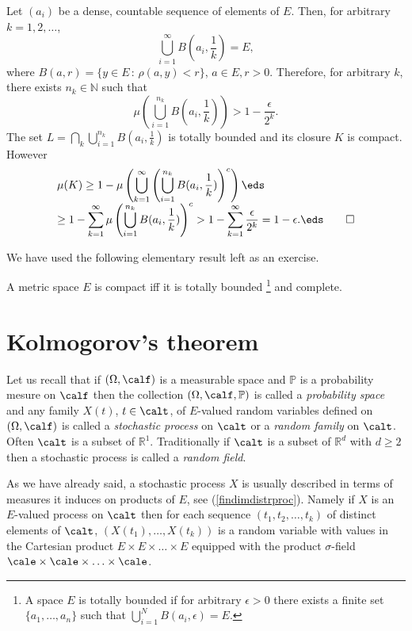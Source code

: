 \documentclass[preprint]{imsart}
\def\P{\mathbb P}
\def\N{\mathbb N}
\def\R{\mathbb R}
\def\ds{\displaystyle}
\begin{document}
{
Let $(a_i)$ be a dense, countable sequence of elements
of $E$. Then, for arbitrary $k=1,2,\ldots$,
$$
\bigcup_{i=1}^\infty B(a_i,\frac{1}{k}) =E,
$$
where $B(a,r)=\{ y\in E\, :\, \rho (a,y)<r\}$, $a\in
E,r>0$. Therefore, for arbitrary $k$, there exists
$n_k\in\N$ such that
$$
\mu\left(\bigcup_{i=1}^{n_k}B(a_i,\frac{1}{k})\right) >
1-\frac{\epsilon}{2^k}.
$$
The set $L= \bigcap_k\bigcup_{i=1}^{n_k}
B(a_i,\frac{1}{k})$ is totally bounded and its closure
$K$ is compact. However
$$
  \begin{array}{l}
    \ds \mu (K)\geq 1-\mu \left(\bigcup_{k=1}^\infty
    \left(\bigcup_{i=1}^{n_k} B(a_i,\frac{1}{k})\right)^c
    \right)\eds \\\ds
    \geq 1-\sum_{k=1}^\infty \mu
     \left(\bigcup_{i=1}^{n_k} B(a_i,\frac{1}{k})\right)^c
     > 1-\sum_{k=1}^\infty\frac{\epsilon}{2^k}=1-\epsilon.
     \eds\qed
  \end{array}
$$

\noindent We have used the following elementary result left as an
exercise.

\begin{Proposition}
  A metric space $E$ is compact iff it is
  totally bounded
\footnote{
A space $E$ is totally bounded if for arbitrary
$\epsilon >0$ there exists a finite set
$\{a_1,\ldots,a_n\}$ such that
$\bigcup_{i=1}^NB(a_i,\epsilon)=E$.
}
   and complete.
\end{Proposition}


\section{Kolmogorov's theorem}

Let us recall that if $(\Omega,\calf)$ is a measurable space and  $\P$ is
a probability mesure on $\calf$ then the collection $(\Omega,\calf ,\P)$
is called a {\em probability space}
and any family $X(t)$, $t\in\calt$, of $E$-valued
random variables defined on $(\Omega,\calf)$ is called
a {\em stochastic process} on $\calt$ or a {\em random
family} on $\calt$. Often $\calt$ is a subset of
$\R^1$. Traditionally if $\calt$ is a subset of $\R^d$
with $d\geq 2$ then a stochastic process is called a
{\em random field}.


As we have already said, a stochastic  process $X$ is usually described in terms of measures it
induces on products of $E$,\,\,see (\ref{findimdistrproc}). Namely if
$X$ is an $E$-valued process on $\calt$ then for each
sequence $(t_1,t_2,\ldots,t_k)$ of distinct elements of
$\calt$, $(X(t_1),\ldots,X(t_k))$ is a random variable
with values in the Cartesian product $E\times
E\times\ldots\times E$ equipped with the product
$\sigma$-field $\cale\times\cale\times\ldots\times \cale$.

}
\end{document}
